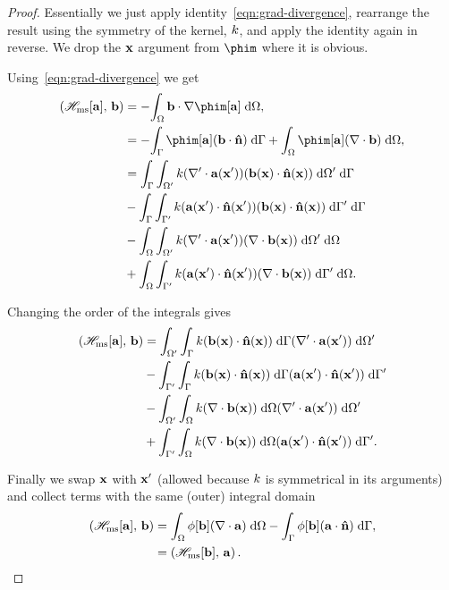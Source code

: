 \begin{proof}

  Essentially we just apply identity~\eqref{eqn:grad-divergence}, rearrange the result using the symmetry of the kernel, $\knl$, and apply the identity again in reverse. We drop the $\xv$ argument from $\phim$ where it is obvious.

  Using~\eqref{eqn:grad-divergence} we get
  \begin{equation}
    \begin{aligned}
      \ip{\hmsop[\av]}{\bv} &= -\intd{\bv \cdot \grad \phim[\av] }, \\
      &= - \intb{\phim[\av] (\bv \cdot \nv)} + \intd{\phim[\av] (\div \bv) }, \\
      &= \intb{ \intd[\magd']{\knl (\nabla' \cdot \av(\xv')) (\bv(\xv) \cdot \nv(\xv))}} \\
      &- \intb{ \intd[\boundd']{\knl (\av(\xv') \cdot \nv(\xv')) (\bv(\xv) \cdot \nv(\xv))}} \\
      &- \intd{ \intd[\magd']{\knl (\nabla' \cdot \av(\xv')) (\div \bv(\xv))}} \\
      &+ \intd{ \intd[\boundd']{\knl (\av(\xv') \cdot \nv(\xv')) (\div \bv(\xv))}}.
    \end{aligned}
  \end{equation}

Changing the order of the integrals gives
  \begin{equation}
    \begin{aligned}
      \ip{\hmsop[\av]}{\bv}
      &= \intd[\magd']{ \intb{\knl (\bv(\xv) \cdot \nv(\xv))} (\nabla' \cdot \av(\xv'))} \\
      &- \intd[\boundd']{ \intb{\knl (\bv(\xv) \cdot \nv(\xv))} (\av(\xv') \cdot \nv(\xv'))} \\
      &- \intd[\magd']{ \intd{\knl (\div \bv(\xv))} (\nabla' \cdot \av(\xv'))} \\
      &+ \intd[\boundd']{ \intd{\knl (\div \bv(\xv))} (\av(\xv') \cdot \nv(\xv'))}.
    \end{aligned}
  \end{equation}

  Finally we swap $\xv$ with $\xv'$ (allowed because $\knl$ is symmetrical in its arguments) and collect terms with the same (outer) integral domain
  \begin{equation}
    \begin{aligned}
      \ip{\hmsop[\av]}{\bv} &= \intd{\phi[\bv] (\div \av)} - \intb{\phi[\bv] (\av \cdot \nv)}, \\
      & = \ip{\hmsop[\bv]}{\av}.
    \end{aligned}
  \end{equation}

\end{proof}

